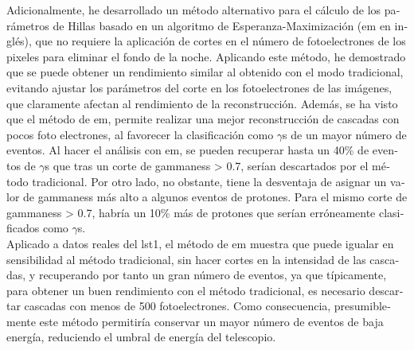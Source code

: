 \documentclass[main.tex]{subfiles}
\begin{document}
\begin{otherlanguage}{spanish}
Adicionalmente, he desarrollado un método alternativo para el cálculo de los parámetros de Hillas basado en un algoritmo de Esperanza-Maximización (\gls{em} en inglés), que no requiere la aplicación de cortes en el número de fotoelectrones de los pixeles para eliminar el fondo de la noche. Aplicando este método, he demostrado que se puede obtener un rendimiento similar al obtenido con el modo tradicional, evitando ajustar los parámetros del corte en los fotoelectrones de las imágenes, que claramente afectan al rendimiento de la reconstrucción. Además, se ha visto que el método de \gls{em}, permite realizar una mejor reconstrucción de cascadas con pocos foto electrones, al favorecer la clasificación como $\gamma$s de un mayor número de eventos. Al hacer el análisis con \gls{em}, se pueden recuperar hasta un 40\% de eventos de $\gamma$s que tras un corte de gammaness > 0.7, serían descartados por el método tradicional. Por otro lado, no obstante, tiene la desventaja de asignar un valor de gammaness más alto a algunos eventos de protones. Para el mismo corte de gammaness > 0.7, habría un 10\% más de protones que serían erróneamente clasificados como $\gamma$s.\\
Aplicado a datos reales del \gls{lst}1, el método de \gls{em} muestra que puede igualar en sensibilidad al método tradicional, sin hacer cortes en la intensidad de las cascadas, y recuperando por tanto un gran número de eventos, ya que típicamente, para obtener un buen rendimiento con el método tradicional, es necesario descartar cascadas con menos de 500 fotoelectrones. Como consecuencia, presumiblemente este método permitiría conservar un mayor número de eventos de baja energía, reduciendo el umbral de energía del telescopio.\\


\end{otherlanguage}
\end{document}
